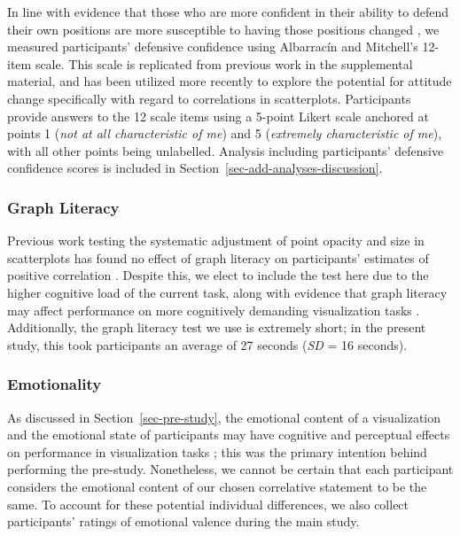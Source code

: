 \documentclass[sigconf]{acmart}
\begin{document}
In line with evidence that those who are more confident in their ability
to defend their own positions are more susceptible to having those
positions changed \citep{albarracin_2004}, we measured participants'
defensive confidence using Albarracín and Mitchell's
\citep{albarracin_2004} 12-item scale. This scale is replicated from
previous work in the supplemental material, and has been utilized more
recently \citep{markant_2023} to explore the potential for attitude
change specifically with regard to correlations in scatterplots.
Participants provide answers to the 12 scale items using a 5-point
Likert scale anchored at points 1 (\emph{not at all characteristic of
me}) and 5 (\emph{extremely characteristic of me}), with all other
points being unlabelled. Analysis including participants' defensive
confidence scores is included in
Section~\ref{sec-add-analyses-discussion}.

\subsubsection{Graph Literacy}\label{sec-graph-lit}

Previous work testing the systematic adjustment of point opacity and
size in scatterplots has found no effect of graph literacy on
participants' estimates of positive correlation
\citep{strain_2023, strain_2023b, strain_2024}. Despite this, we elect
to include the test here due to the higher cognitive load of the current
task, along with evidence that graph literacy may affect performance on
more cognitively demanding visualization tasks
\citep{canham_2010, okan_2012}. Additionally, the graph literacy test we
use \citep{garcia_2016} is extremely short; in the present study, this
took participants an average of 27 seconds (\emph{SD} = 16 seconds).

\subsubsection{Emotionality}\label{sec-emotionality}

As discussed in Section~\ref{sec-pre-study}, the emotional content of a
visualization and the emotional state of participants may have cognitive
and perceptual effects on performance in visualization tasks
\citep{phelps_2006, harrison_2013, thoresen_2016}; this was the primary
intention behind performing the pre-study. Nonetheless, we cannot be
certain that each participant considers the emotional content of our
chosen correlative statement to be the same. To account for these
potential individual differences, we also collect participants' ratings
of emotional valence during the main study.
\end{document}
